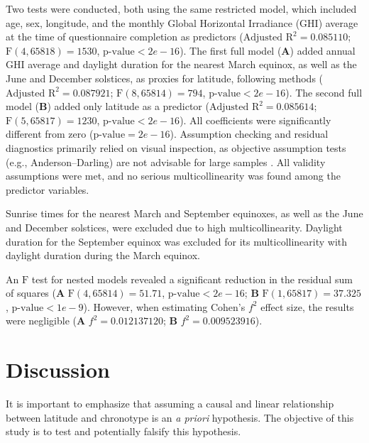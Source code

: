 \documentclass[
12pt,
openright,
oneside,
a4paper,
chapter=TITLE,
section=TITLE,
french,
spanish,
brazil,
english
]{abntex2}
\begin{document}
Two tests were conducted, both using the same restricted model, which
included age, sex, longitude, and the monthly Global Horizontal
Irradiance (GHI) average at the time of questionnaire completion as
predictors (\(\text{Adjusted R}^{2} = 0.085110\);
\(\text{F}(4, 65818) = 1530\), \(\text{p-value} < 2e-16\)). The first
full model (\textbf{A}) added annual GHI average and daylight duration
for the nearest March equinox, as well as the June and December
solstices, as proxies for latitude, following
\textcite{leocadio-miguel2017} methods
(\(\text{Adjusted R}^{2} = 0.087921\); \(\text{F}(8, 65814) = 794\),
\(\text{p-value} < 2e-16\)). The second full model (\textbf{B}) added
only latitude as a predictor (\(\text{Adjusted R}^{2} = 0.085614\);
\(\text{F}(5, 65817) = 1230\), \(\text{p-value} < 2e-16\)). All
coefficients were significantly different from zero
(\(\text{p-value} = 2e-16\)). Assumption checking and residual
diagnostics primarily relied on visual inspection, as objective
assumption tests (e.g., Anderson--Darling) are not advisable for large
samples \autocite{shatz2024}. All validity assumptions were met, and no
serious multicollinearity was found among the predictor variables.

Sunrise times for the nearest March and September equinoxes, as well as
the June and December solstices, were excluded due to high
multicollinearity. Daylight duration for the September equinox was
excluded for its multicollinearity with daylight duration during the
March equinox.

An \(\text{F}\) test for nested models revealed a significant reduction
in the residual sum of squares (\textbf{A}
\(\text{F}(4, 65814) = 51.71\), \(\text{p-value} < 2e-16\); \textbf{B}
\(\text{F}(1, 65817) = 37.325\), \(\text{p-value} < 1e-9\)). However,
when estimating Cohen's \(f^2\) effect size, the results were negligible
\autocite{cohen1992} (\textbf{A} \(f^{2} = 0.012137120\); \textbf{B}
\(f^{2} = 0.009523916\)).

\section{Discussion}\label{discussion}

It is important to emphasize that assuming a causal and linear
relationship between latitude and chronotype is an \emph{a priori}
hypothesis. The objective of this study is to test and potentially
falsify this hypothesis.
\end{document}
